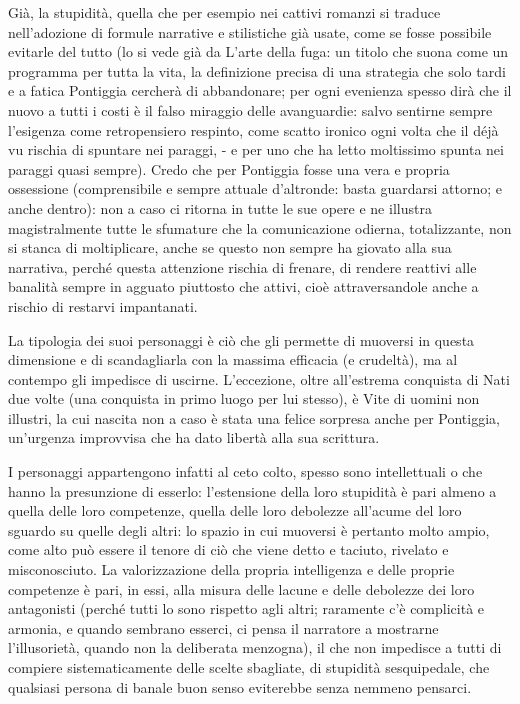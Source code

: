 Già, la stupidità, quella che per esempio nei cattivi romanzi si traduce nell’adozione di formule narrative e stilistiche già usate, come se fosse possibile evitarle del tutto (lo si vede già da L’arte della fuga: un titolo che suona come un programma per tutta la vita, la definizione precisa di una strategia che solo tardi e a fatica Pontiggia cercherà di abbandonare; per ogni evenienza spesso dirà che il nuovo a tutti i costi è il falso miraggio delle avanguardie: salvo sentirne sempre l’esigenza come retropensiero respinto, come scatto ironico ogni volta che il déjà vu rischia di spuntare nei paraggi, - e per uno che ha letto moltissimo spunta nei paraggi quasi sempre). Credo che per Pontiggia fosse una vera e propria ossessione (comprensibile e sempre attuale d’altronde: basta guardarsi attorno; e anche dentro): non a caso ci ritorna in tutte le sue opere e ne illustra magistralmente tutte le sfumature che la comunicazione odierna, totalizzante, non si stanca di moltiplicare, anche se questo non sempre ha giovato alla sua narrativa, perché questa attenzione rischia di frenare, di rendere reattivi alle banalità sempre in agguato piuttosto che attivi, cioè attraversandole anche a rischio di restarvi impantanati.

La tipologia dei suoi personaggi è ciò che gli permette di muoversi in questa dimensione e di scandagliarla con la massima efficacia (e crudeltà), ma al contempo gli impedisce di uscirne. L’eccezione, oltre all’estrema conquista di Nati due volte (una conquista in primo luogo per lui stesso), è Vite di uomini non illustri, la cui nascita non a caso è stata una felice sorpresa anche per Pontiggia, un’urgenza improvvisa che ha dato libertà alla sua scrittura.

I personaggi appartengono infatti al ceto colto, spesso sono intellettuali o che hanno la presunzione di esserlo: l’estensione della loro stupidità è pari almeno a quella delle loro competenze, quella delle loro debolezze all’acume del loro sguardo su quelle degli altri: lo spazio in cui muoversi è pertanto molto ampio, come alto può essere il tenore di ciò che viene detto e taciuto, rivelato e misconosciuto.
La valorizzazione della propria intelligenza e delle proprie competenze è pari, in essi, alla misura delle lacune e delle debolezze dei loro antagonisti (perché tutti lo sono rispetto agli altri; raramente c’è complicità e armonia, e quando sembrano esserci, ci pensa il narratore a mostrarne l’illusorietà, quando non la deliberata menzogna), il che non impedisce a tutti di compiere sistematicamente delle scelte sbagliate, di stupidità sesquipedale, che qualsiasi persona di banale buon senso eviterebbe senza nemmeno pensarci.\newline

